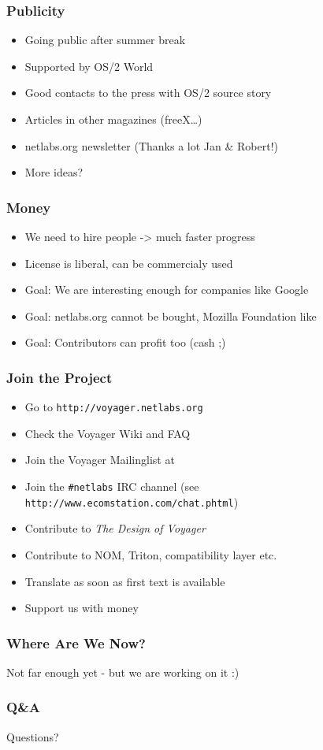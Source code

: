 \documentclass{beamer}
\begin{document}
\begin{frame}
\frametitle{Publicity}
\begin{itemize}[<+->]
  \item Going public after summer break
  \item Supported by OS/2 World
  \item Good contacts to the press with OS/2 source story
  \item Articles in other magazines (freeX\ldots)
  \item netlabs.org newsletter (Thanks a lot Jan \& Robert!)
  \item More ideas?
\end{itemize}
\end{frame}

\begin{frame}
\frametitle{Money}
\begin{itemize}[<+->]
  \item We need to hire people -> much faster progress
  \item License is liberal, can be commercialy used
  \item Goal: We are interesting enough for companies like Google
  \item Goal: netlabs.org cannot be bought, Mozilla Foundation like
  \item Goal: Contributors can profit too (cash ;)
\end{itemize}
\end{frame}

\begin{frame}
\frametitle{Join the Project}
\begin{itemize}[<+->]
  \item Go to \texttt{http://voyager.netlabs.org}
  \item Check the Voyager Wiki and FAQ
  \item Join the Voyager Mailinglist at
  \item Join the \texttt{\#netlabs} IRC channel (see
  \texttt{http://www.ecomstation.com/chat.phtml})
  \item Contribute to \textit{The Design of Voyager}
  \item Contribute to NOM, Triton, compatibility layer etc.
  \item Translate as soon as first text is available
  \item Support us with money
\end{itemize}
\end{frame}

\begin{frame}
\frametitle{Where Are We Now?}
	Not far enough yet - but we are working on it :)
\end{frame}

\begin{frame}
\frametitle{Q\&A}
	Questions?
\end{frame}
\end{document}
